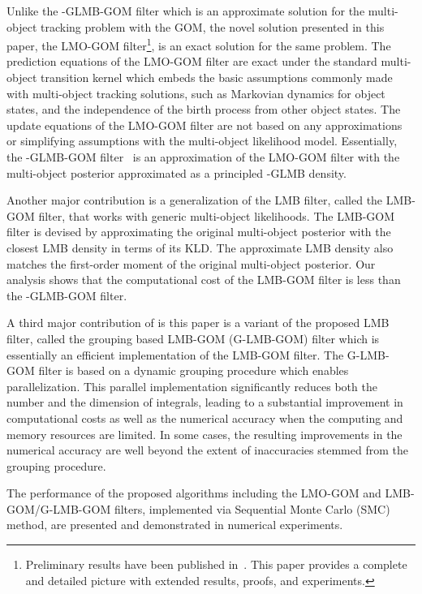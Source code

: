 \documentclass[journal]{IEEEtran}
\begin{document}
Unlike the -GLMB-GOM filter which is an approximate solution for the  multi-object tracking problem with the GOM, the novel solution presented in this paper, the  LMO-GOM filter\footnote{Preliminary results have been published in~\cite{refr:conference-GOM}. This paper provides a complete and detailed picture with extended results, proofs, and experiments.}, is an exact solution for the same problem.
The prediction equations of the LMO-GOM filter are exact under the standard multi-object transition kernel which embeds  the basic assumptions commonly made with multi-object tracking solutions, such as Markovian dynamics for object states, and the independence of the  birth process from other object states.  The update equations of the LMO-GOM filter are not  based on any approximations or simplifying assumptions with the multi-object likelihood model. Essentially, the -GLMB-GOM filter~ is an  approximation of the LMO-GOM filter with the multi-object posterior  approximated as a principled -GLMB density. 





Another major contribution is a generalization of the LMB filter, called the  LMB-GOM filter, that works with generic multi-object likelihoods. The LMB-GOM filter is devised by approximating the original multi-object posterior  with the closest LMB density in terms of its KLD. The approximate LMB density also matches the  first-order moment of the original multi-object posterior.  
Our analysis shows that    the computational cost of the LMB-GOM filter  is  less than the -GLMB-GOM filter.

A third major contribution of is  this paper is a variant of the proposed LMB filter, called the grouping based LMB-GOM (G-LMB-GOM) filter which is essentially an efficient implementation  of the  LMB-GOM filter.  The G-LMB-GOM filter is based on a dynamic grouping procedure which enables parallelization.
This parallel implementation significantly reduces both the number and the dimension of integrals,    leading to a substantial improvement in computational costs  as well as the numerical accuracy  when the computing and memory  resources are  limited.  In some cases, the resulting improvements in the numerical accuracy are well beyond the extent of inaccuracies stemmed from the grouping procedure.




The performance of the proposed algorithms including the LMO-GOM and LMB-GOM/G-LMB-GOM filters, implemented via Sequential Monte Carlo (SMC) method, are presented and  demonstrated in numerical experiments.
\end{document}
